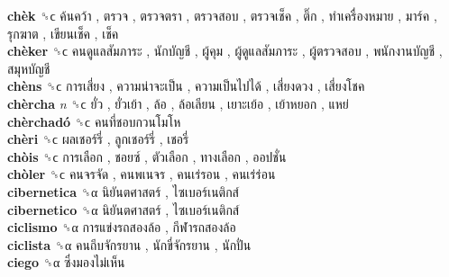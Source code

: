 \textbf{chèk} ␝ϲ   ค้นคว้า ,  ตรวจ ,  ตรวจตรา ,  ตรวจสอบ ,  ตรวจเช็ค ,  ติ๊ก ,  ทำเครื่องหมาย ,  มาร์ค ,  รุกฆาต ,  เขียนเช็ค ,  เช็ค   \\
\textbf{chèker} ␝ϲ   คนดูแลสัมภาระ ,  นักบัญชี ,  ผู้คุม ,  ผู้ดูแลสัมภาระ ,  ผู้ตรวจสอบ ,  พนักงานบัญชี ,  สมุหบัญชี   \\
\textbf{chèns} ␝ϲ   การเสี่ยง ,  ความน่าจะเป็น ,  ความเป็นไปได้ ,  เสี่ยงดวง ,  เสี่ยงโชค   \\
\textbf{chèrcha} \emph{n}  ␝ϲ   ยั่ว ,  ยั่วเย้า ,  ล้อ ,  ล้อเลียน ,  เยาะเย้อ ,  เย้าหยอก ,  แหย่   \\
\textbf{chèrchadó} ␝ϲ   คนที่ชอบกวนโมโห   \\
\textbf{chèri} ␝ϲ   ผลเชอร์รี่ ,  ลูกเชอร์รี่ ,  เชอรี่   \\
\textbf{chòis} ␝ϲ   การเลือก ,  ชอยซ์ ,  ตัวเลือก ,  ทางเลือก ,  ออปชั่น   \\
\textbf{chòler} ␝ϲ   คนจรจัด ,  คนพเนจร ,  คนเร่รอน ,  คนเร่ร่อน   \\
\textbf{cibernetica} ␝α   นิยันตศาสตร์ ,  ไซเบอร์เนติกส์   \\
\textbf{cibernetico} ␝α   นิยันตศาสตร์ ,  ไซเบอร์เนติกส์   \\
\textbf{ciclismo} ␝α   การแข่งรถสองล้อ ,  กีฬารถสองล้อ   \\
\textbf{ciclista} ␝α   คนถีบจักรยาน ,  นักขี่จักรยาน ,  นักปั่น   \\
\textbf{ciego} ␝α   ซึ่งมองไม่เห็น   \\
